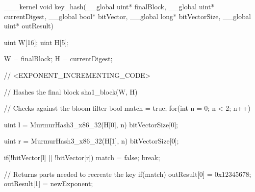 
\begin{adjustbox}{width=\textwidth,height=15cm,keepaspectratio}
  \centering
  \begin{OpenCLCode}
  ___kernel void key_hash(__global uint* finalBlock, 
                       __global uint* currentDigest, 
                       __global bool* bitVector, 
                       __global long* bitVectorSize, 
                       __global uint* outResult)
  {
    uint W[16];
    uint H[5];

    W = finalBlock;
    H = currentDigest;

    // <EXPONENT_INCREMENTING_CODE>
  
    // Hashes the final block
    sha1_block(W, H)
  
    // Checks against the bloom filter
    bool match = true;
    for(int n = 0; n < 2; n++)
    {		
      uint l = MurmurHash3_x86_32(H[0], n) %
              bitVectorSize[0];

      uint r = MurmurHash3_x86_32(H[1], n) %
              bitVectorSize[0];
  
      if(!bitVector[l] || !bitVector[r])
      {
        match = false;
        break;
      }
    }
  
    // Returns parts needed to recreate the key
    if(match)
    {
      outResult[0] = 0x12345678;
      outResult[1] = newExponent;
    }
  }
  \end{OpenCLCode}
\end{adjustbox}